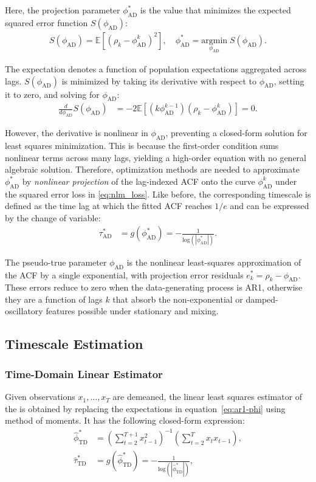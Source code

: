 \documentclass[9pt]{article}
\newcommand{\hatphitd}{\hat{\phi}^*_{\scriptscriptstyle\text{TD}}}
\newcommand{\hattautd}{\hat{\tau}^*_{\scriptscriptstyle\text{TD}}}
\newcommand{\phiad}{\phi_{\scriptscriptstyle\text{AD}}}
\newcommand{\tauad}{\tau_{\scriptscriptstyle\text{AD}}}
\begin{document}
Here, the projection parameter $\phiad^*$ is the value that minimizes the expected squared error function $S(\phiad)$:
\begin{align}\label{eq:nlm_loss}
    S(\phiad) = \mathbb{E}[(\rho_k - \phiad^k)^2], \quad \phiad^* = \underset{\phiad}{\text{argmin}} \; S(\phiad).
\end{align}

\noindent The expectation denotes a function of population expectations aggregated across lags. $S(\phiad)$ is minimized by taking its derivative with respect to $\phiad$, setting it to zero, and solving for $\phiad$:
\begin{align}
    \frac{d}{d\phiad} S(\phiad) &= -2\mathbb{E}[(k\phiad^{k-1})(\rho_k - \phiad^k)] = 0.
\end{align}

\noindent However, the derivative is nonlinear in $\phiad$, preventing a closed-form solution for least squares minimization. This is because the first-order condition sums nonlinear terms across many lags, yielding a high-order equation with no general algebraic solution. Therefore, optimization methods are needed to approximate $\phiad^*$ by \textit{nonlinear projection} of the lag-indexed ACF onto the curve $\phiad^k$ under the squared error loss in \eqref{eq:nlm_loss}. Like before, the corresponding timescale is defined as the time lag at which the fitted ACF reaches $1/e$ and can be expressed by the change of variable:
\begin{align}
    \tauad^* &= g(\phiad^*) = -\frac{1}{\text{log}(|\phiad^*|)}. \label{eq:nlm-tau}
\end{align}

The pseudo-true parameter $\phiad$ is the nonlinear least-squares approximation of the ACF by a single exponential, with projection error residuals $e_k^* = \rho_k - \phiad$. These errors reduce to zero when the data-generating process is AR1, otherwise they are a function of lags $k$ that absorb the non-exponential or damped-oscillatory features possible under stationary and mixing. 

\subsection{Timescale Estimation}\label{sec:timescale-estimation}
\subsubsection{Time-Domain Linear Estimator}\label{sec:time-domain-linear-estimator}
Given observations $x_1, \ldots, x_T$ are demeaned, the linear least squares estimator of the  is obtained by replacing the expectations in equation~\eqref{eq:ar1-phi} using method of moments. It has the following closed-form expression:
\begin{align}
    \hatphitd &= \left(\sum_{t=2}^{T+1} x_{t-1}^2\right)^{-1} \left(\sum_{t=2}^T x_t x_{t-1}\right),\\
    \hattautd &= g(\hatphitd) = -\frac{1}{\text{log}(|\hatphitd|)},
\end{align}
\end{document}
